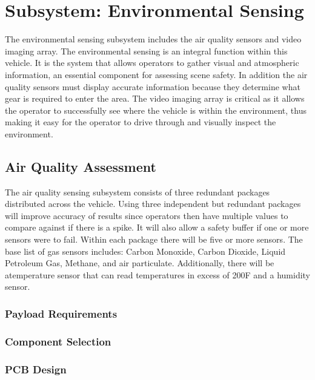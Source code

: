 \chapter{Subsystem: Environmental Sensing}

The environmental sensing subsystem includes the air quality sensors and video imaging array. The environmental sensing is an integral function within this vehicle. It is the system that allows operators to gather visual and atmospheric information, an essential component for assessing scene safety. In addition the air quality sensors must display accurate information because they determine what gear is required to enter the area. The video imaging array is critical as it allows the operator to successfully see where the vehicle is within the environment, thus making it easy for the operator to drive through and visually inspect the environment. 

\section{Air Quality Assessment}

The air quality sensing subsystem consists of three redundant packages distributed across the vehicle. Using three independent but redundant packages will improve accuracy of results since operators then have multiple values to compare against if there is a spike. It will also allow a safety buffer if one or more sensors were to fail. Within each package there will be five or more sensors. The base list of gas sensors includes: Carbon Monoxide, Carbon Dioxide, Liquid Petroleum Gas, Methane, and air particulate. Additionally, there will be atemperature sensor that can read temperatures in excess of 200\degree F and a humidity sensor. 

\subsection{Payload Requirements}

\subsection{Component Selection}

\subsection{PCB Design}

